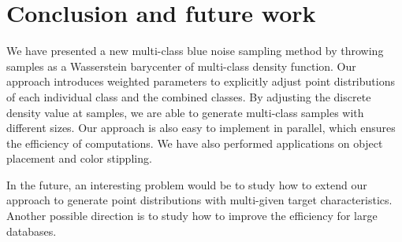 \section{Conclusion and future work}
We have presented a new multi-class blue noise sampling method by
throwing samples as a  Wasserstein barycenter of multi-class density function.
Our approach introduces weighted parameters to explicitly adjust point distributions of each individual class and the combined classes.
By adjusting the discrete density value at samples,
we are able to generate multi-class samples with different sizes.
Our approach is also easy to implement in parallel, which ensures the efficiency of computations.
We have also performed applications on object placement and color stippling.

In the future,
an interesting problem would be to study how to extend our approach to generate point distributions with multi-given target characteristics.
Another possible direction is to study how to improve the efficiency for large databases.
